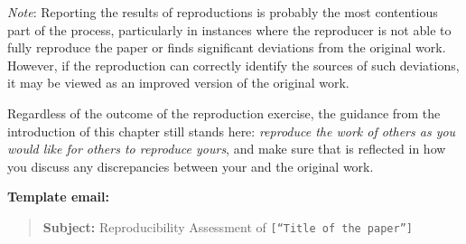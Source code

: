 \documentclass[]{book}
\begin{document}
\emph{Note}: Reporting the results of reproductions is probably the most contentious part of the process, particularly in instances where the reproducer is not able to fully reproduce the paper or finds significant deviations from the original work. However, if the reproduction can correctly identify the sources of such deviations, it may be viewed as an improved version of the original work.

Regardless of the outcome of the reproduction exercise, the guidance from the introduction of this chapter still stands here: \emph{reproduce the work of others as you would like for others to reproduce yours}, and make sure that is reflected in how you discuss any discrepancies between your and the original work.

\textbf{Template email:}

\begin{quote}
\textbf{Subject:} Reproducibility Assessment of \texttt{{[}“Title\ of\ the\ paper”{]}}
\end{quote}
\end{document}
